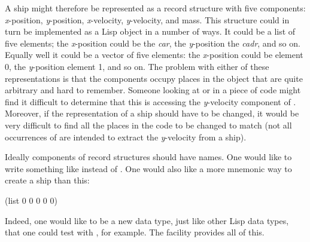 A ship might therefore be represented as a record structure with five
components: {\it x}-position, {\it y}-position, {\it x}-velocity, {\it y}-velocity, and mass.
This structure could in turn be implemented as a Lisp object in a
number of ways.  It could be a list of five elements; the {\it x}-position
could be the {\it car}, the {\it y}-position the {\it cadr}, and so on.  Equally
well it could be a vector of five elements: the {\it x}-position could be
element 0, the {\it y}-position element 1, and so on.  The problem with either
of these representations is that the components occupy places in the
object that are quite arbitrary and hard to remember.  Someone looking at
 or  in a piece of code might
find it difficult to determine that this is accessing the {\it y}-velocity
component of .  Moreover, if the representation of a ship should
have to be changed, it would be very difficult to find all the places
in the code to be changed to match (not all occurrences of 
are intended to extract the {\it y}-velocity from a ship).

Ideally components of record structures should have names.  One would
like to write something like
 instead of .
One would also like a more mnemonic way to create a ship than this:
\begin{lisp}
(list 0 0 0 0 0)
\end{lisp}
Indeed, one would like  to be a new data type, just like other
Lisp data types, that one could test with , for example.
The  facility provides all of this.


